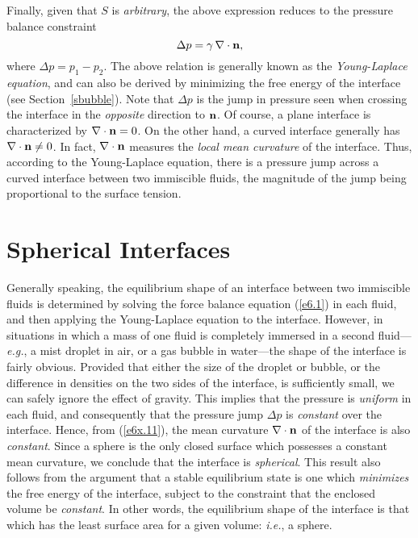 Finally, given that $S$ is {\em arbitrary}, the above expression reduces to the pressure balance constraint
\begin{equation}\label{e6x.11}
\Delta p = \gamma\,\nabla\cdot{\bf n},
\end{equation}
where $\Delta p = p_1-p_2$.
The above relation is generally known as the {\em Young-Laplace equation}, and
can also be derived by minimizing the free energy of the interface (see Section~\ref{sbubble}). Note that $\Delta p$ is
the jump in pressure seen when crossing the interface in the {\em opposite}\/ direction to ${\bf n}$.
Of course, a plane interface is characterized by $\nabla\cdot{\bf n}=0$. On the other hand, a curved
interface generally has $\nabla\cdot{\bf n}\neq 0$. In fact, $\nabla\cdot{\bf n}$ measures the {\em local
 mean curvature}\/ of the interface. Thus, according to the Young-Laplace equation, there is a pressure jump across  
a curved interface between two immiscible fluids, the
magnitude of the jump being proportional to the surface tension. 

\section{Spherical Interfaces}\label{s6x3}
Generally speaking, the equilibrium shape of an interface between two immiscible fluids is determined by solving
the force balance equation (\ref{e6.1}) in each fluid, and then applying the Young-Laplace equation to the
interface. However, in situations in which a mass of one fluid is completely
immersed in a second fluid---{\em e.g.}, a mist droplet in air, or a gas bubble in water---the shape of the interface is fairly obvious.  Provided that either the
size of the droplet or bubble, or the difference in densities on the two sides of the interface, is sufficiently small,
we can safely ignore the effect of gravity. This implies that the pressure is {\em uniform}\/ in each fluid, and consequently that the pressure jump
$\Delta p$ is {\em constant}\/ over the interface. Hence, from (\ref{e6x.11}), the mean curvature $\nabla\cdot{\bf n}$
of the interface is also {\em constant}.  Since a sphere is the only closed surface which possesses  a constant mean curvature, we conclude that
 the interface is {\em spherical}. This result also follows from the argument that a stable equilibrium state
is one which {\em minimizes}\/ the free energy of the interface, subject to the constraint that the enclosed volume be 
{\em constant}. In other words, the equilibrium shape of the interface is that which
has the least surface area for a given volume: {\em i.e.}, a sphere.


